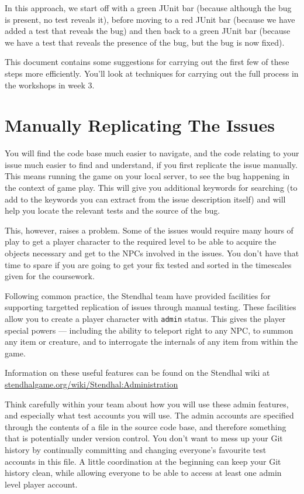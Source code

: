 \documentclass[
]{book}
\begin{document}
In this approach, we start off with a green JUnit bar (because although the bug is present, no test reveals it), before moving to a red JUnit bar (because we have added a test that reveals the bug) and then back to a green JUnit bar (because we have a test that reveals the presence of the bug, but the bug is now fixed).

This document contains some suggestions for carrying out the first few of these steps more efficiently. You'll look at techniques for carrying out the full process in the workshops in week 3.

\hypertarget{replicating}{%
\section{Manually Replicating The Issues}\label{replicating}}

You will find the code base much easier to navigate, and the code relating to your issue much easier to find and understand, if you first replicate the issue manually. This means running the game on your local server, to see the bug happening in the context of game play. This will give you additional keywords for searching (to add to the keywords you can extract from the issue description itself) and will help you locate the relevant tests and the source of the bug.

This, however, raises a problem. Some of the issues would require many hours of play to get a player character to the required level to be able to acquire the objects necessary and get to the NPCs involved in the issues. You don't have that time to spare if you are going to get your fix tested and sorted in the timescales given for the coursework.

Following common practice, the Stendhal team have provided facilities for supporting targetted replication of issues through manual testing. These facilities allow you to create a player character with \texttt{admin} status. This gives the player special powers --- including the ability to teleport right to any NPC, to summon any item or creature, and to interrogate the internals of any item from within the game.

Information on these useful features can be found on the Stendhal wiki at \href{https://stendhalgame.org/wiki/Stendhal:Administration}{stendhalgame.org/wiki/Stendhal:Administration}

Think carefully within your team about how you will use these admin features, and especially what test accounts you will use. The admin accounts are specified through the contents of a file in the source code base, and therefore something that is potentially under version control. You don't want to mess up your Git history by continually committing and changing everyone's favourite test accounts in this file. A little coordination at the beginning can keep your Git history clean, while allowing everyone to be able to access at least one admin level player account.
\end{document}
